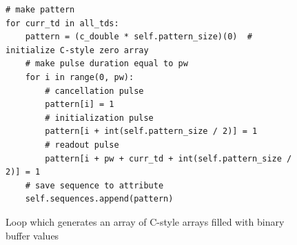 \begin{figure}[ht]
	\begin{lstlisting}[language=pythe]		
# make pattern
for curr_td in all_tds:
	pattern = (c_double * self.pattern_size)(0)  # initialize C-style zero array
	# make pulse duration equal to pw
	for i in range(0, pw):
		# cancellation pulse
		pattern[i] = 1  
		# initialization pulse
		pattern[i + int(self.pattern_size / 2)] = 1  
		# readout pulse
		pattern[i + pw + curr_td + int(self.pattern_size / 2)] = 1 
	# save sequence to attribute 
	self.sequences.append(pattern)
	\end{lstlisting}
	\caption{Loop which generates an array of C-style arrays filled with binary buffer values}
	\label{fig:td:sequence_gen_loop}
\end{figure}



